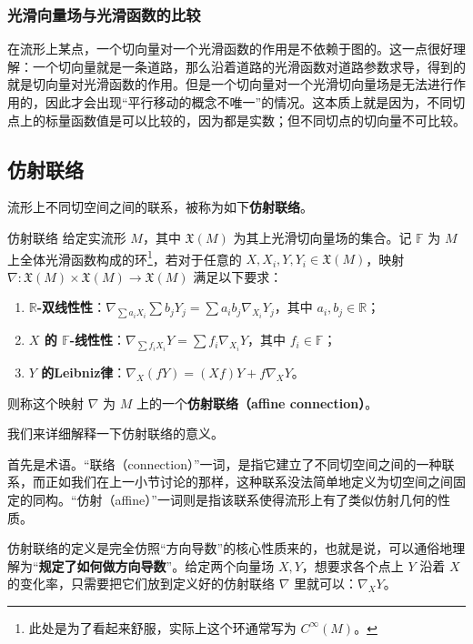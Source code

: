 \subsubsection{光滑向量场与光滑函数的比较}

在流形上某点，一个切向量对一个光滑函数的作用是不依赖于图的。这一点很好理解：一个切向量就是一条道路，那么沿着道路的光滑函数对道路参数求导，得到的就是切向量对光滑函数的作用。但是一个切向量对一个光滑切向量场是无法进行作用的，因此才会出现“平行移动的概念不唯一”的情况。这本质上就是因为，不同切点上的标量函数值是可以比较的，因为都是实数；但不同切点的切向量不可比较。


\subsection{仿射联络}

流形上不同切空间之间的联系，被称为如下\textbf{仿射联络}。

\begin{definition}{仿射联络}
给定实流形 $M$，其中 $\mathfrak{X}(M)$ 为其上光滑切向量场的集合。记 $\mathbb{F}$ 为 $M$ 上全体光滑函数构成的环\footnote{此处是为了看起来舒服，实际上这个环通常写为 $C^\infty(M)$。}，若对于任意的 $X, X_i, Y, Y_i\in\mathfrak{X}(M)$，映射 $\nabla:\mathfrak{X}(M)\times\mathfrak{X}(M)\to\mathfrak{X}(M)$ 满足以下要求：
\begin{enumerate}
\item \textbf{$\mathbb{R}$-双线性性}：$\nabla_{\sum a_iX_i}\sum b_jY_j=\sum a_ib_j\nabla_{X_i}Y_j$，其中 $a_i, b_j\in\mathbb{R}$；
\item \textbf{$X$ 的 $\mathbb{F}$-线性性}：$\nabla_{\sum f_iX_i}Y=\sum f_i\nabla_{X_i}Y$，其中 $f_i\in\mathbb{F}$；
\item \textbf{$Y$ 的Leibniz律}：$\nabla_X(fY)=(Xf)Y+f\nabla_XY$。
\end{enumerate}
则称这个映射 $\nabla$ 为 $M$ 上的一个\textbf{仿射联络（affine connection）}。
\end{definition}

我们来详细解释一下仿射联络的意义。

首先是术语。“联络（connection）”一词，是指它建立了不同切空间之间的一种联系，而正如我们在上一小节讨论的那样，这种联系没法简单地定义为切空间之间固定的同构。“仿射（affine）”一词则是指该联系使得流形上有了类似仿射几何的性质。

仿射联络的定义是完全仿照“方向导数”的核心性质来的，也就是说，可以通俗地理解为“\textbf{规定了如何做方向导数}”。给定两个向量场 $X, Y$，想要求各个点上 $Y$ 沿着 $X$ 的变化率，只需要把它们放到定义好的仿射联络 $\nabla$ 里就可以：$\nabla_XY$。

